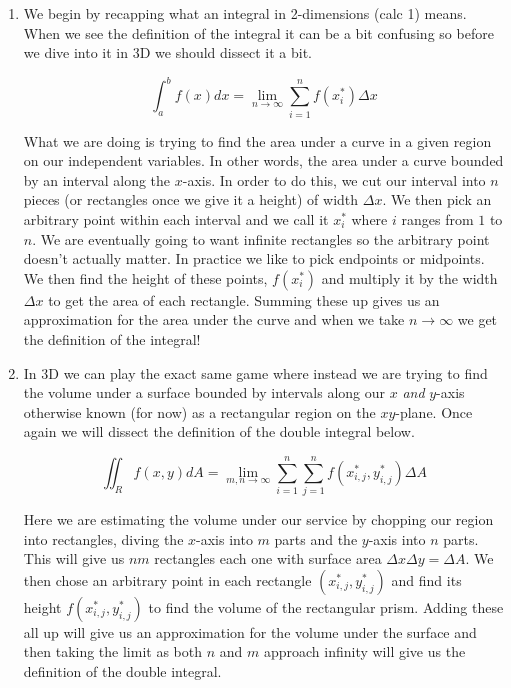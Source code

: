 \documentclass[11pt]{article}
\begin{document}
\begin{enumerate}
\item We begin by recapping what an integral in 2-dimensions (calc 1) means. When we see the definition of the integral it can be a bit confusing so before we dive into it in 3D we should dissect it a bit.

\begin{equation*}
    \int_a^b f(x) dx = \lim_{n\to \infty} \sum_{i=1}^n f(x_i^*) \Delta x
\end{equation*}

What we are doing is trying to find the area under a curve in a given region on our independent variables. In other words, the area under a curve bounded by an interval along the $x$-axis. In order to do this, we cut our interval into $n$ pieces (or rectangles once we give it a height) of width $\Delta x$. We then pick an arbitrary point within each interval and we call it $x^*_i$ where $i$ ranges from $1$ to $n$. We are eventually going to want infinite rectangles so the arbitrary point doesn't actually matter. In practice we like to pick endpoints or midpoints. We then find the height of these points, $f(x_i^*)$ and multiply it by the width $\Delta x$ to get the area of each rectangle. Summing these up gives us an approximation for the area under the curve and when we take $n\to \infty$ we get the definition of the integral!

\item In 3D we can play the exact same game where instead we are trying to find the volume under a surface bounded by intervals along our $x$ \emph{and} $y$-axis otherwise known (for now) as a rectangular region on the $xy$-plane. Once again we will dissect the definition of the double integral below.

\begin{equation*}
    \iint_R f(x,y) dA = \lim_{m,n \to \infty} \sum_{i=1}^n \sum_{j=1}^n f(x^*_{i,j}, y^*_{i,j}) \Delta A 
\end{equation*}

Here we are estimating the volume under our service by chopping our region into rectangles, diving the $x$-axis into $m$ parts and the $y$-axis into $n$ parts. This will give us $nm$ rectangles each one with surface area $\Delta x \Delta y = \Delta A$. We then chose an arbitrary point in each rectangle $(x^*_{i,j}, y^*_{i,j})$ and find its height $f(x^*_{i,j}, y^*_{i,j})$ to find the volume of the rectangular prism. Adding these all up will give us an approximation for the volume under the surface and then taking the limit as both $n$ and $m$ approach infinity will give us the definition of the double integral.


\end{enumerate}
\end{document}
